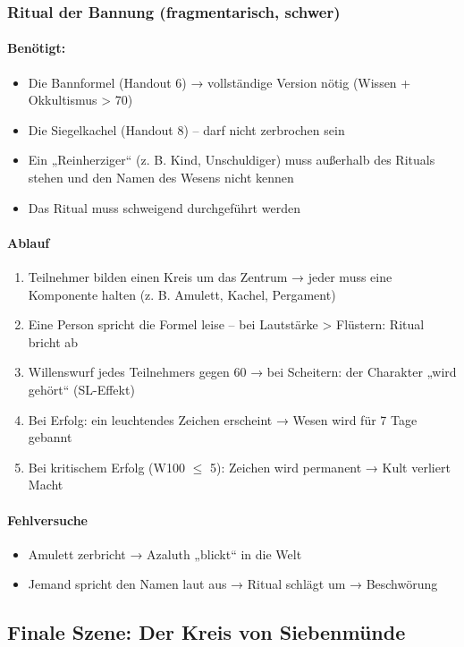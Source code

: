 \subsubsection{Ritual der Bannung (fragmentarisch, schwer)}
\paragraph{Benötigt:}
\begin{itemize}
\item Die Bannformel (Handout 6) → vollständige Version nötig (Wissen + Okkultismus > 70)
\item Die Siegelkachel (Handout 8) – darf nicht zerbrochen sein
\item Ein „Reinherziger“ (z. B. Kind, Unschuldiger) muss außerhalb des Rituals stehen und den Namen des Wesens nicht kennen
\item Das Ritual muss schweigend durchgeführt werden
\end{itemize}
\paragraph{Ablauf}
\begin{enumerate}
\item Teilnehmer bilden einen Kreis um das Zentrum → jeder muss eine Komponente halten (z. B. Amulett, Kachel, Pergament)
\item Eine Person spricht die Formel leise – bei Lautstärke > Flüstern: Ritual bricht ab
\item Willenswurf jedes Teilnehmers gegen 60 → bei Scheitern: der Charakter „wird gehört“ (SL-Effekt)
\item Bei Erfolg: ein leuchtendes Zeichen erscheint → Wesen wird für 7 Tage gebannt
\item Bei kritischem Erfolg (W100 $\leq$ 5): Zeichen wird permanent → Kult verliert Macht
\end{enumerate}
\paragraph{Fehlversuche}
\begin{itemize}
\item Amulett zerbricht → Azaluth „blickt“ in die Welt
\item Jemand spricht den Namen laut aus → Ritual schlägt um → Beschwörung
\end{itemize}

\subsection{Finale Szene: Der Kreis von Siebenmünde}
